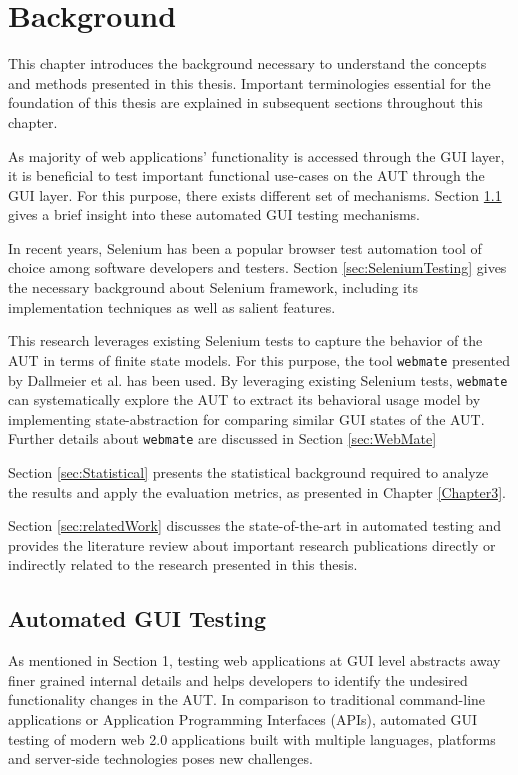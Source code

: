\chapter{Background}
\label{Chapter2}


This chapter introduces the background necessary to understand the concepts and methods presented in this thesis. Important terminologies essential for the foundation of this thesis are explained in subsequent sections throughout this chapter.

As majority of web applications' functionality is accessed through the GUI layer, it is beneficial to test important functional use-cases on the AUT through the GUI layer. For this purpose, there exists different set of mechanisms. Section \ref{sec:AutomatedGUITesting} gives a brief insight into these automated GUI testing mechanisms.

In recent years, Selenium\cite{websiteSelenium} has been a popular browser test automation tool of choice among software developers and testers. Section \ref{sec:SeleniumTesting} gives the necessary background about Selenium framework, including its implementation techniques as well as salient features.

This research leverages existing Selenium tests to capture the behavior of the AUT in terms of finite state models. For this purpose, the tool \texttt{webmate} presented by Dallmeier et al.\cite{webmate} has been used. By leveraging existing Selenium tests, \texttt{webmate} can systematically explore the AUT to extract its behavioral usage model by implementing state-abstraction for comparing similar GUI states of the AUT. Further details about \texttt{webmate} are discussed in Section \ref{sec:WebMate}

Section \ref{sec:Statistical} presents the statistical background required to analyze the results and apply the evaluation metrics, as presented in Chapter \ref{Chapter3}.

Section \ref{sec:relatedWork} discusses the state-of-the-art in automated testing and provides the literature review about important research publications directly or indirectly related to the research presented in this thesis. 

\section{Automated GUI Testing}
\label{sec:AutomatedGUITesting}
As mentioned in Section 1, testing web applications at GUI level abstracts away finer grained internal details and helps developers to identify the undesired functionality changes in the AUT.  In comparison to traditional command-line applications or Application Programming Interfaces (APIs), automated GUI testing of modern web 2.0 applications built with multiple languages, platforms and server-side technologies poses new challenges.

